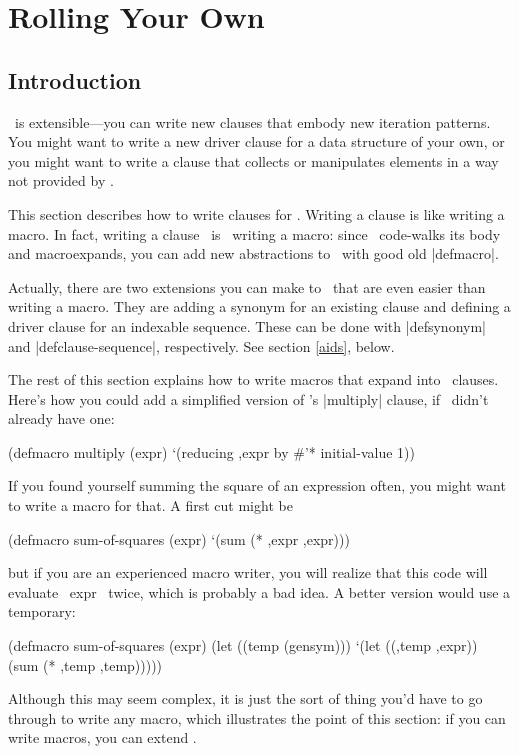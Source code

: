 \section{Rolling Your Own}
\label{extend}

\subsection{Introduction}

\iter\ is extensible---you can write new clauses that embody new
iteration patterns.  You might want to write a new driver clause for a
data structure of your own, or you might want to write a clause that
collects or manipulates elements in a way not provided by \iter.

This section describes how to write clauses for \iter.  Writing a
clause is like writing a macro.  In fact, writing a clause ~is~
writing a macro: since \iter\ code-walks its body and macroexpands,
you can add new abstractions to \iter\ with good old |defmacro|.

Actually, there are two extensions you can make to \iter\ that are
even easier than writing a macro.  They are adding a synonym for an
existing clause and defining a driver clause for an indexable
sequence.  These can be done with |defsynonym| and
|defclause-sequence|, respectively.  See section \ref{aids}, below.

The rest of this section explains how to write macros that expand into
\iter\ clauses.
Here's how you could add a simplified version of \iter's |multiply|
clause, if \iter\ didn't already have one:
\begin{program}
(defmacro multiply (expr)
  `(reducing ,expr by \#'* initial-value 1))
\end{program}

If you found yourself summing the square of an expression often, you
might want to write a macro for that.  A first cut might be
\begin{program}
(defmacro sum-of-squares (expr)
  `(sum (* ,expr ,expr)))
\end{program}
but if you are an experienced macro writer, you will realize that this
code will evaluate ~expr~ twice, which is probably a bad idea.  A
better version would use a temporary:
\begin{program}
(defmacro sum-of-squares (expr)
  (let ((temp (gensym)))
    `(let ((,temp ,expr))
       (sum (* ,temp ,temp)))))
\end{program}
Although this may seem complex, it is just the sort of thing you'd
have to go through to write any macro, which illustrates the point of
this section: if you can write macros, you can extend \iter.

